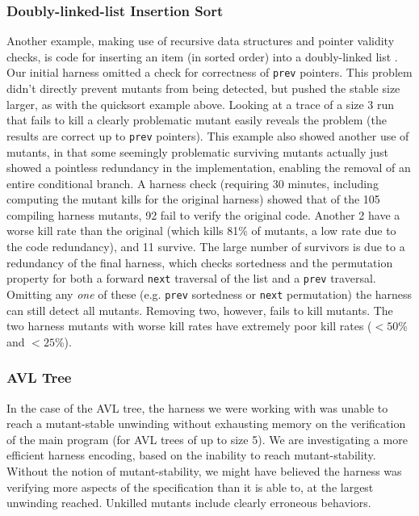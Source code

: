 \documentclass{svjour3}
\begin{document}
\subsubsection{Doubly-linked-list Insertion Sort}

Another example, making use of recursive data structures and pointer
validity checks, is code for inserting an item (in
sorted order) into a doubly-linked list \cite{DLLInsert}.  Our initial
harness omitted a check for correctness of {\tt prev} pointers.  This
problem didn't directly prevent mutants from being detected, but
pushed the stable size larger, as with the quicksort example above.
Looking at a trace of a size 3 run that fails to kill a clearly
problematic mutant easily reveals the problem (the results are correct
up to {\tt prev} pointers).  This example also showed another use of
mutants, in that some seemingly problematic surviving mutants actually
just showed a pointless redundancy in the implementation, enabling the
removal of an entire conditional branch.  A harness check (requiring
30 minutes, including computing the mutant kills for the original
harness) showed that of the 105 compiling harness mutants, 92 fail to
verify the original code.  Another 2 have a worse kill rate than the
original (which kills 81\% of mutants, a low rate due to the code
redundancy), and 11 survive.  The large number of survivors is due to
a redundancy of the final harness, which checks sortedness and the
permutation property for both a forward {\tt next} traversal of the
list and a {\tt prev} traversal.  Omitting any \emph{one} of these
(e.g. {\tt prev} sortedness or {\tt next} permutation) the harness can
still detect all mutants.  Removing two, however, fails to kill
mutants.  The two harness mutants with worse kill rates have extremely poor
kill rates ($<50$\% and $<25$\%).

\subsubsection{AVL Tree}

In the case of the AVL tree, the harness we were working with
was unable to reach a mutant-stable unwinding without exhausting
memory on the verification of the main program (for AVL trees of up to
size 5).  We are investigating a more efficient harness encoding,
based on the inability to reach mutant-stability.  Without the notion
of mutant-stability, we might have believed the harness was verifying
more aspects of the specification than it is able to, at the largest
unwinding reached.  Unkilled mutants include clearly erroneous behaviors.
\end{document}
